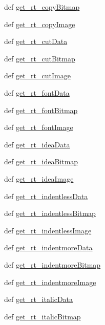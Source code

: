 \begin{DoxyCompactItemize}
def \hyperlink{namespaceimages_aedff5b143a4964815b0074d0acf90151}{get\_\-rt\_\-copyBitmap}
\item 
def \hyperlink{namespaceimages_ae60f98e51b824035bb5fe182d283d55e}{get\_\-rt\_\-copyImage}
\item 
def \hyperlink{namespaceimages_afada48e2437ca29287f793a6d4d772fa}{get\_\-rt\_\-cutData}
\item 
def \hyperlink{namespaceimages_ac0a6d5c57c505aed376695f945c62d21}{get\_\-rt\_\-cutBitmap}
\item 
def \hyperlink{namespaceimages_a19dbc51c51ba0f558ca9d3fbf553a6eb}{get\_\-rt\_\-cutImage}
\item 
def \hyperlink{namespaceimages_a48b71c466c680ad944a8b7c3ee229cf5}{get\_\-rt\_\-fontData}
\item 
def \hyperlink{namespaceimages_a2e33141030dbc25e0b8512dba08e69c6}{get\_\-rt\_\-fontBitmap}
\item 
def \hyperlink{namespaceimages_a8096f3cc0b27dd2fb73cbd2a3eefebe8}{get\_\-rt\_\-fontImage}
\item 
def \hyperlink{namespaceimages_adfcf6374c55909c0148faeb15b8543ad}{get\_\-rt\_\-ideaData}
\item 
def \hyperlink{namespaceimages_a38ba317d28580963c61be0a30244b723}{get\_\-rt\_\-ideaBitmap}
\item 
def \hyperlink{namespaceimages_ad0cadefa0c97788c2a2da77327f51e9b}{get\_\-rt\_\-ideaImage}
\item 
def \hyperlink{namespaceimages_a2df76f5654cba7cea28c08239bfbbd66}{get\_\-rt\_\-indentlessData}
\item 
def \hyperlink{namespaceimages_a9a15baea70c188e99ec881b358e73814}{get\_\-rt\_\-indentlessBitmap}
\item 
def \hyperlink{namespaceimages_ab120938cbd54d80d42ee6bc872b10fe9}{get\_\-rt\_\-indentlessImage}
\item 
def \hyperlink{namespaceimages_a56890700e7ce7216db68610c7644f525}{get\_\-rt\_\-indentmoreData}
\item 
def \hyperlink{namespaceimages_a0b82a04475bbaa1467cd4cbca3e1a96e}{get\_\-rt\_\-indentmoreBitmap}
\item 
def \hyperlink{namespaceimages_a4a86a62e5f89662fef52eebdb79f9d95}{get\_\-rt\_\-indentmoreImage}
\item 
def \hyperlink{namespaceimages_aa180b28317f20449cd412b15a87fce64}{get\_\-rt\_\-italicData}
\item 
def \hyperlink{namespaceimages_a7a674a85398511ebc2d839241d2708a4}{get\_\-rt\_\-italicBitmap}
\item 

\end{DoxyCompactItemize}
